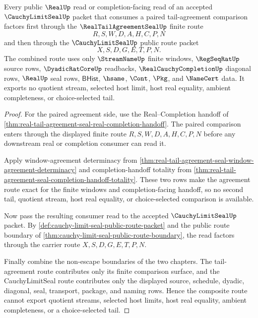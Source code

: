\begin{theorem}
\label{thm:cauchy-limit-seal-tail-agreement-public-route-factorization}
Every public $\RealUp$ read or completion-facing read of an accepted $\CauchyLimitSealUp$ packet that consumes a paired tail-agreement comparison factors first through the $\RealTailAgreementSealUp$ finite route
$$
R,S,W,D,A,H,C,P,N
$$
and then through the $\CauchyLimitSealUp$ public route packet
$$
X,S,D,G,E,T,P,N.
$$
The combined route uses only $\StreamNameUp$ finite windows, $\RegSeqRatUp$ source rows, $\DyadicRatCoreUp$ readbacks, $\RealCauchyCompletionUp$ diagonal rows, $\RealUp$ seal rows, $\mathsf{BHist}$, $\hsame$, $\Cont$, $\Pkg$, and $\NameCert$ data. It exports no quotient stream, selected host limit, host real equality, ambient completeness, or choice-selected tail.
\end{theorem}
\begin{proof}
For the paired agreement side, use the Real--Completion handoff of \autoref{thm:real-tail-agreement-seal-real-completion-handoff}. The paired comparison enters through the displayed finite route $R,S,W,D,A,H,C,P,N$ before any downstream real or completion consumer can read it.

Apply window-agreement determinacy from \autoref{thm:real-tail-agreement-seal-window-agreement-determinacy} and completion-handoff totality from \autoref{thm:real-tail-agreement-seal-completion-handoff-totality}. These two rows make the agreement route exact for the finite windows and completion-facing handoff, so no second tail, quotient stream, host real equality, or choice-selected comparison is available.

Now pass the resulting consumer read to the accepted $\CauchyLimitSealUp$ packet. By \autoref{def:cauchy-limit-seal-public-route-packet} and the public route boundary of \autoref{thm:cauchy-limit-seal-public-route-boundary}, the read factors through the carrier route $X,S,D,G,E,T,P,N$.

Finally combine the non-escape boundaries of the two chapters. The tail-agreement route contributes only its finite comparison surface, and the CauchyLimitSeal route contributes only the displayed source, schedule, dyadic, diagonal, seal, transport, package, and naming rows. Hence the composite route cannot export quotient streams, selected host limits, host real equality, ambient completeness, or a choice-selected tail.
\end{proof}

